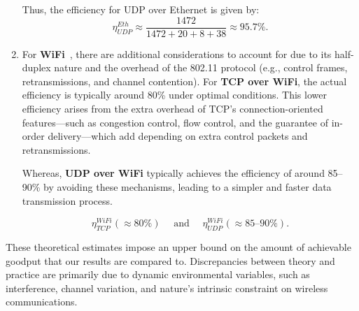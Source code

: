 \begin{enumerate}
                \noindent Thus, the efficiency for UDP over Ethernet is given by:
                \[
                \eta_{UDP}^{Eth} \approx \frac{1472}{1472 + 20 + 8 + 38} \approx 95.7\%.
                \]


            \item  
                For \textbf{WiFi}~\cite{ieee80211ax}, there are additional considerations to account for due to its half-duplex nature and the overhead of the 802.11 protocol (e.g., control frames, retransmissions, and channel contention). 
                For \textbf{TCP over WiFi}, the actual efficiency is typically around 80\% under optimal conditions. 
                This lower efficiency arises from the extra overhead of TCP’s connection-oriented features—such as congestion control, 
                flow control, and the guarantee of in-order delivery—which add depending on extra control packets and retransmissions.
                
                Whereas, \textbf{UDP over WiFi} typically achieves the efficiency of around 85–90\% by avoiding these mechanisms, 
                leading to a simpler and faster data transmission process.
        
                \[
                    \eta_{TCP}^{WiFi} (\approx 80\%) \hspace{1em} \text{ and } \hspace{1em} \eta_{UDP}^{WiFi} (\approx 85\text{–}90\%).
                \]
            
        \end{enumerate}

        \noindent These theoretical estimates impose an upper bound on the amount of achievable goodput that our results are compared to.
        Discrepancies between theory and practice are primarily due to dynamic environmental variables, such as interference, channel variation, and nature's intrinsic constraint on wireless communications.
